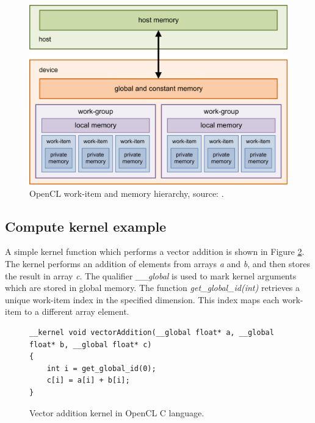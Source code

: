 \documentclass[
  digital,     %
  oneside,     %
  nosansbold,  %
  nocolorbold, %
  lof,         %
  lot,         %
  nocover
]{fithesis4}
\begin{document}
\begin{figure}
    \begin{center}
    \includegraphics[width=125mm]{Figures/OpenClHierarchy.png}
    \end{center}
    \caption{OpenCL work-item and memory hierarchy, source: \cite{opencl-hierarchy-diagram}.}
    \label{opencl-hierarchy}
\end{figure}

\subsection{Compute kernel example}
A simple kernel function which performs a vector addition is shown in Figure \ref{vector_addition}. The kernel performs an addition of elements from arrays \textit{a} and \textit{b}, and then stores the result in array \textit{c}. The qualifier \textit{\_\_global} is used to mark kernel arguments which are stored in global memory. The function \textit{get\_global\_id(int)} retrieves a unique work-item index in the specified dimension. This index maps each work-item to a different array element.

\begin{figure}
\begin{lstlisting}
__kernel void vectorAddition(__global float* a, __global float* b, __global float* c)
{
    int i = get_global_id(0);
    c[i] = a[i] + b[i];
}
\end{lstlisting}
\caption{Vector addition kernel in OpenCL C language.}
\label{vector_addition}
\end{figure}
\end{document}
